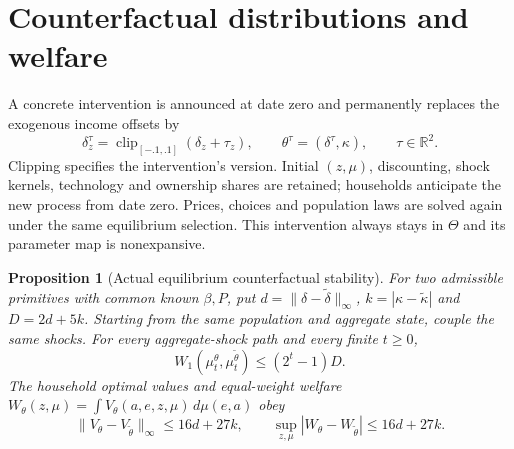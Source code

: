 \documentclass[11pt,a4paper]{article}
\newtheorem{proposition}[theorem]{Proposition}
\begin{document}
\section{Counterfactual distributions and welfare}
\label{sec:counterfactual}
A concrete intervention is announced at date zero and permanently replaces
the exogenous income offsets by
\[
 \delta_z^\tau=\operatorname{clip}_{[-.1,.1]}(\delta_z+\tau_z),\qquad
 \theta^\tau=(\delta^\tau,\kappa),\qquad\tau\in\mathbb R^2.  \tag{I24}
\]
Clipping specifies the intervention's version. Initial $(z,\mu)$, discounting,
shock kernels, technology and ownership shares are retained; households
anticipate the new process from date zero. Prices, choices and population
laws are solved again under the same equilibrium selection. This intervention
always stays in $\Theta$ and its parameter map is nonexpansive.
\begin{proposition}[Actual equilibrium counterfactual stability]
\label{prop:counterfactual-stability}
For two admissible primitives with common known $\beta,P$, put
$d=\|\delta-\widetilde\delta\|_\infty$, $k=|\kappa-\widetilde\kappa|$ and
$D=2d+5k$. Starting from the same population and aggregate state, couple the
same shocks. For every aggregate-shock path and every finite $t\geq0$,
\[
 W_1(\mu_t^\theta,\mu_t^{\widetilde\theta})\leq(2^t-1)D.     \tag{I25}
\]
The household optimal values and equal-weight welfare
$W_\theta(z,\mu)=\int V_\theta(a,e,z,\mu)\,d\mu(e,a)$ obey
\[
 \|V_\theta-V_{\widetilde\theta}\|_\infty\leq16d+27k,\qquad
 \sup_{z,\mu}|W_\theta-W_{\widetilde\theta}|\leq16d+27k.      \tag{I26}
\]
\end{proposition}
\end{document}
